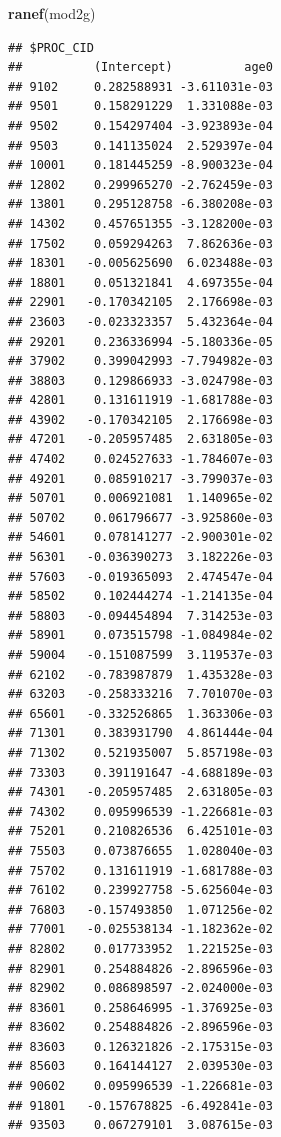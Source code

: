 \documentclass[ignorenonframetext,]{beamer}
\newenvironment{Shaded}{\begin{snugshade}}{\end{snugshade}}
\newcommand{\KeywordTok}[1]{\textcolor[rgb]{0.13,0.29,0.53}{\textbf{{#1}}}}
\newcommand{\NormalTok}[1]{{#1}}
\begin{document}
\begin{frame}[fragile]

\small

\begin{Shaded}
\begin{Highlighting}[]
\KeywordTok{ranef}\NormalTok{(mod2g)}
\end{Highlighting}
\end{Shaded}

\begin{verbatim}
## $PROC_CID
##          (Intercept)          age0
## 9102     0.282588931 -3.611031e-03
## 9501     0.158291229  1.331088e-03
## 9502     0.154297404 -3.923893e-04
## 9503     0.141135024  2.529397e-04
## 10001    0.181445259 -8.900323e-04
## 12802    0.299965270 -2.762459e-03
## 13801    0.295128758 -6.380208e-03
## 14302    0.457651355 -3.128200e-03
## 17502    0.059294263  7.862636e-03
## 18301   -0.005625690  6.023488e-03
## 18801    0.051321841  4.697355e-04
## 22901   -0.170342105  2.176698e-03
## 23603   -0.023323357  5.432364e-04
## 29201    0.236336994 -5.180336e-05
## 37902    0.399042993 -7.794982e-03
## 38803    0.129866933 -3.024798e-03
## 42801    0.131611919 -1.681788e-03
## 43902   -0.170342105  2.176698e-03
## 47201   -0.205957485  2.631805e-03
## 47402    0.024527633 -1.784607e-03
## 49201    0.085910217 -3.799037e-03
## 50701    0.006921081  1.140965e-02
## 50702    0.061796677 -3.925860e-03
## 54601    0.078141277 -2.900301e-02
## 56301   -0.036390273  3.182226e-03
## 57603   -0.019365093  2.474547e-04
## 58502    0.102444274 -1.214135e-04
## 58803   -0.094454894  7.314253e-03
## 58901    0.073515798 -1.084984e-02
## 59004   -0.151087599  3.119537e-03
## 62102   -0.783987879  1.435328e-03
## 63203   -0.258333216  7.701070e-03
## 65601   -0.332526865  1.363306e-03
## 71301    0.383931790  4.861444e-04
## 71302    0.521935007  5.857198e-03
## 73303    0.391191647 -4.688189e-03
## 74301   -0.205957485  2.631805e-03
## 74302    0.095996539 -1.226681e-03
## 75201    0.210826536  6.425101e-03
## 75503    0.073876655  1.028040e-03
## 75702    0.131611919 -1.681788e-03
## 76102    0.239927758 -5.625604e-03
## 76803   -0.157493850  1.071256e-02
## 77001   -0.025538134 -1.182362e-02
## 82802    0.017733952  1.221525e-03
## 82901    0.254884826 -2.896596e-03
## 82902    0.086898597 -2.024000e-03
## 83601    0.258646995 -1.376925e-03
## 83602    0.254884826 -2.896596e-03
## 83603    0.126321826 -2.175315e-03
## 85603    0.164144127  2.039530e-03
## 90602    0.095996539 -1.226681e-03
## 91801   -0.157678825 -6.492841e-03
## 93503    0.067279101  3.087615e-03

\end{verbatim}
\end{frame}
\end{document}
